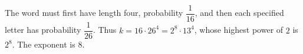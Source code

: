 The word must first have length four, probability $\dfrac{1}{16}$, and then each specified letter has probability $\dfrac{1}{26}$. Thus $k=16\cdot26^4=2^8\cdot13^4$, whose highest power of $2$ is $2^8$. The exponent is $\boxed8$.
